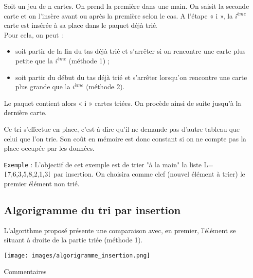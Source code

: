 \documentclass[t,11pt]{article}
\begin{document}
Soit un jeu de n cartes. On prend la première dans une main. On saisit la seconde carte et on l'insère avant ou après la première selon le cas.
A l'étape « i », la $i^{ème}$ carte est insérée à sa place dans le paquet déjà trié.\\
Pour cela, on peut :
\begin{itemize}
\item soit partir de la fin du tas déjà trié et s'arrêter si on rencontre une carte plus petite que la $i^{ème}$ (méthode 1) ;
\item 	soit partir du début du tas déjà trié et s'arrêter lorsqu'on rencontre une carte plus grande que la $i^{ème}$ (méthode 2).
\end{itemize}
	
Le paquet contient alors « i » cartes triées. On procède ainsi de suite jusqu'à la dernière carte.

Ce tri s'effectue en place, c'est-à-dire qu'il ne demande pas d'autre tableau que celui que l'on trie. 
Son coût en mémoire est donc constant si on ne compte pas la place occupée par les données.

\newpage
\texttt{Exemple} : L'objectif de cet exemple est de trier "à la main" la liste L=\verb![!7,6,3,5,8,2,1,3\verb!]! par insertion.
On choisira comme clef (nouvel élément à trier) le premier élément non trié. 

\begin{python}
\vspace*{13cm}
\end{python}


\newpage
\subsection{Algorigramme du tri par insertion}

L'algorithme proposé présente une comparaison avec, en premier, l'élément se situant à droite de la partie triée (méthode 1).

\begin{minipage}{.45\textwidth}%
\begin{center}
\texttt{[image: images/algorigramme\_insertion.png]}
\end{center}
\end{minipage}%
\hfill
\begin{minipage}{.5\textwidth}%
\vspace*{0.6cm}
\begin{python}
Commentaires
\vspace*{13cm}
\end{python}
\end{minipage}
\end{document}
